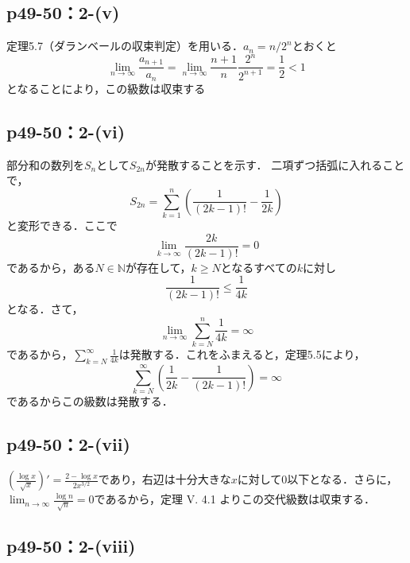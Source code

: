 \documentclass[uplatex,dvipdfmx,a4paper,10pt,fleqn]{jsarticle}
\begin{document}
  \subsection*{p49-50：2-(v)}


	\begin{screen}
        定理5.7（ダランベールの収束判定）を用いる．$a_n=n/2^n$とおくと
        \[
        \lim_{n \to \infty}\frac{a_{n+1}}{a_n}=\lim_{n \to \infty}\frac{n+1}{n}\frac{2^n}{2^{n+1}}=\frac{1}{2}<1
        \]
        となることにより，この級数は収束する
        \end{screen}
        
    \subsection*{p49-50：2-(vi)}

    \begin{screen}
部分和の数列を$S_{n}$として$S_{2n}$が発散することを示す． 二項ずつ括弧に入れることで，
\[
  S_{2n} = \sum ^{n}_{k=1} \left (\frac{1}{(2k-1)!} - \frac{1}{2k} \right )
\]
と変形できる．ここで
\[
\lim_{k \to \infty} \frac{2k}{(2k-1)!} = 0
\]
であるから，ある$N \in \mathbb{N}$が存在して，$k \geq N$となるすべての$k$に対し
\[
\frac{1}{(2k-1)!} \leq \frac{1}{4k}
\] 
となる．さて，
\[
  \lim_{n \to \infty} \sum ^{n}_{k=N} \frac{1}{4k} = \infty
\]
であるから，$\sum ^{\infty}_{k=N} \frac{1}{4k}$は発散する．これをふまえると，定理5.5により，
\[
  \sum^{\infty}_{k=N} \left (\frac{1}{2k} - \frac{1}{(2k-1)!}\right) =\infty
\]
であるからこの級数は発散する．
    \end{screen}



    \subsection*{p49-50：2-(vii)}
\begin{screen}
  $\left (\frac{\log x}{\sqrt x}\right)' = \frac{2-\log x}{2x^{3/2}}$であり，右辺は十分大きな$x$に対して$0$以下となる．さらに，$\lim _{n \to \infty} \frac{\log n}{\sqrt n} = 0$であるから，定理 V. 4.1 よりこの交代級数は収束する．
\end{screen}

    \subsection*{p49-50：2-(viii)}
\end{document}
